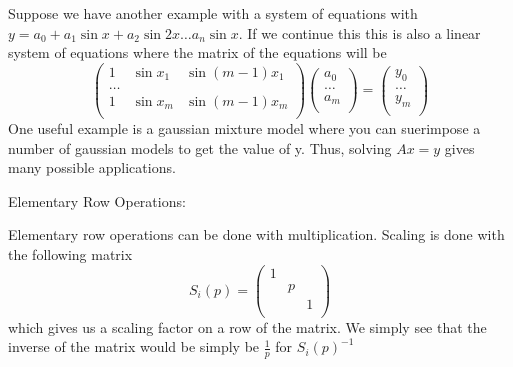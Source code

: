 \begin{remark}
    \begin{eg}
        Suppose we have another example with a system of equations with \(y= a_0 
        + a_1 \sin  x + a_2 \sin  2x \dots a_n \sin  x\). 
        If we continue this this is also a linear system of equations where the matrix of the equations will be 
        \[
            \begin{pmatrix}
                1 &  \sin  x_1 &  \sin  (m-1) x_1 \\
                \dots  &  &   \\
                1 &  \sin  x_m &   \sin  (m-1) x_m\\
            \end{pmatrix} 
            \begin{pmatrix}
                 a_0 \\
                  \dots   \\
                  a_m \\
            \end{pmatrix}
            = 
            \begin{pmatrix}
                 y_0 \\
                  \dots \\
                  y_m \\
            \end{pmatrix}
        \]
        One useful example is a gaussian mixture model where you can suerimpose a number of gaussian models to get
        the value of y. Thus, solving \(Ax = y\) gives many possible applications.
    \end{eg}

\end{remark}
Elementary Row Operations:  

\begin{definition}
    Elementary row operations can be done with multiplication. Scaling is done with the following matrix 
    \[
        S_i (p) = \begin{pmatrix}
            1 &  &   \\
             & p &   \\
             &  &  1  \\
        \end{pmatrix}
    \]
    which gives us a scaling factor on a row of the matrix. We simply see that the inverse of the matrix would be simply be 
    \( \frac{1}{p}\) for \(S_i(p)^{-1} \) 
\end{definition}

